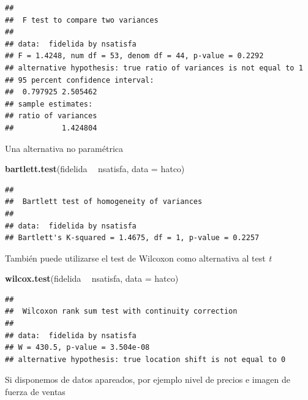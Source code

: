 \documentclass[]{book}
\newenvironment{Shaded}{\begin{snugshade}}{\end{snugshade}}
\newcommand{\KeywordTok}[1]{\textcolor[rgb]{0.13,0.29,0.53}{\textbf{#1}}}
\newcommand{\DataTypeTok}[1]{\textcolor[rgb]{0.13,0.29,0.53}{#1}}
\newcommand{\StringTok}[1]{\textcolor[rgb]{0.31,0.60,0.02}{#1}}
\newcommand{\OtherTok}[1]{\textcolor[rgb]{0.56,0.35,0.01}{#1}}
\newcommand{\OperatorTok}[1]{\textcolor[rgb]{0.81,0.36,0.00}{\textbf{#1}}}
\newcommand{\NormalTok}[1]{#1}
\begin{document}
\begin{verbatim}
## 
##  F test to compare two variances
## 
## data:  fidelida by nsatisfa
## F = 1.4248, num df = 53, denom df = 44, p-value = 0.2292
## alternative hypothesis: true ratio of variances is not equal to 1
## 95 percent confidence interval:
##  0.797925 2.505462
## sample estimates:
## ratio of variances 
##           1.424804
\end{verbatim}

Una alternativa no paramétrica

\begin{Shaded}
\begin{Highlighting}[]
\KeywordTok{bartlett.test}\NormalTok{(fidelida }\OperatorTok{~}\StringTok{ }\NormalTok{nsatisfa, }\DataTypeTok{data =}\NormalTok{ hatco)}
\end{Highlighting}
\end{Shaded}

\begin{verbatim}
## 
##  Bartlett test of homogeneity of variances
## 
## data:  fidelida by nsatisfa
## Bartlett's K-squared = 1.4675, df = 1, p-value = 0.2257
\end{verbatim}

También puede utilizarse el test de Wilcoxon como alternativa al test
\emph{t}

\begin{Shaded}
\begin{Highlighting}[]
\KeywordTok{wilcox.test}\NormalTok{(fidelida }\OperatorTok{~}\StringTok{ }\NormalTok{nsatisfa, }\DataTypeTok{data =}\NormalTok{ hatco)}
\end{Highlighting}
\end{Shaded}

\begin{verbatim}
## 
##  Wilcoxon rank sum test with continuity correction
## 
## data:  fidelida by nsatisfa
## W = 430.5, p-value = 3.504e-08
## alternative hypothesis: true location shift is not equal to 0
\end{verbatim}

Si disponemos de datos apareados, por ejemplo nivel de precios e imagen
de fuerza de ventas

\begin{Shaded}
\end{Shaded}
\end{document}

